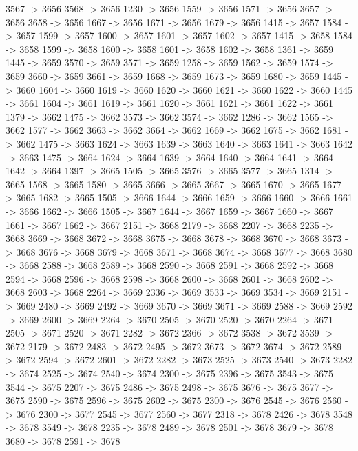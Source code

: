 {	3567 -> 3656
	3568 -> 3656
	1230 -> 3656
	1559 -> 3656
	1571 -> 3656
	3657 -> 3656
	3658 -> 3656
	1667 -> 3656
	1671 -> 3656
	1679 -> 3656
	1415 -> 3657
	1584 -> 3657
	1599 -> 3657
	1600 -> 3657
	1601 -> 3657
	1602 -> 3657
	1415 -> 3658
	1584 -> 3658
	1599 -> 3658
	1600 -> 3658
	1601 -> 3658
	1602 -> 3658
	1361 -> 3659
	1445 -> 3659
	3570 -> 3659
	3571 -> 3659
	1258 -> 3659
	1562 -> 3659
	1574 -> 3659
	3660 -> 3659
	3661 -> 3659
	1668 -> 3659
	1673 -> 3659
	1680 -> 3659
	1445 -> 3660
	1604 -> 3660
	1619 -> 3660
	1620 -> 3660
	1621 -> 3660
	1622 -> 3660
	1445 -> 3661
	1604 -> 3661
	1619 -> 3661
	1620 -> 3661
	1621 -> 3661
	1622 -> 3661
	1379 -> 3662
	1475 -> 3662
	3573 -> 3662
	3574 -> 3662
	1286 -> 3662
	1565 -> 3662
	1577 -> 3662
	3663 -> 3662
	3664 -> 3662
	1669 -> 3662
	1675 -> 3662
	1681 -> 3662
	1475 -> 3663
	1624 -> 3663
	1639 -> 3663
	1640 -> 3663
	1641 -> 3663
	1642 -> 3663
	1475 -> 3664
	1624 -> 3664
	1639 -> 3664
	1640 -> 3664
	1641 -> 3664
	1642 -> 3664
	1397 -> 3665
	1505 -> 3665
	3576 -> 3665
	3577 -> 3665
	1314 -> 3665
	1568 -> 3665
	1580 -> 3665
	3666 -> 3665
	3667 -> 3665
	1670 -> 3665
	1677 -> 3665
	1682 -> 3665
	1505 -> 3666
	1644 -> 3666
	1659 -> 3666
	1660 -> 3666
	1661 -> 3666
	1662 -> 3666
	1505 -> 3667
	1644 -> 3667
	1659 -> 3667
	1660 -> 3667
	1661 -> 3667
	1662 -> 3667
	2151 -> 3668
	2179 -> 3668
	2207 -> 3668
	2235 -> 3668
	3669 -> 3668
	3672 -> 3668
	3675 -> 3668
	3678 -> 3668
	3670 -> 3668
	3673 -> 3668
	3676 -> 3668
	3679 -> 3668
	3671 -> 3668
	3674 -> 3668
	3677 -> 3668
	3680 -> 3668
	2588 -> 3668
	2589 -> 3668
	2590 -> 3668
	2591 -> 3668
	2592 -> 3668
	2594 -> 3668
	2596 -> 3668
	2598 -> 3668
	2600 -> 3668
	2601 -> 3668
	2602 -> 3668
	2603 -> 3668
	2264 -> 3669
	2336 -> 3669
	3533 -> 3669
	3534 -> 3669
	2151 -> 3669
	2480 -> 3669
	2492 -> 3669
	3670 -> 3669
	3671 -> 3669
	2588 -> 3669
	2592 -> 3669
	2600 -> 3669
	2264 -> 3670
	2505 -> 3670
	2520 -> 3670
	2264 -> 3671
	2505 -> 3671
	2520 -> 3671
	2282 -> 3672
	2366 -> 3672
	3538 -> 3672
	3539 -> 3672
	2179 -> 3672
	2483 -> 3672
	2495 -> 3672
	3673 -> 3672
	3674 -> 3672
	2589 -> 3672
	2594 -> 3672
	2601 -> 3672
	2282 -> 3673
	2525 -> 3673
	2540 -> 3673
	2282 -> 3674
	2525 -> 3674
	2540 -> 3674
	2300 -> 3675
	2396 -> 3675
	3543 -> 3675
	3544 -> 3675
	2207 -> 3675
	2486 -> 3675
	2498 -> 3675
	3676 -> 3675
	3677 -> 3675
	2590 -> 3675
	2596 -> 3675
	2602 -> 3675
	2300 -> 3676
	2545 -> 3676
	2560 -> 3676
	2300 -> 3677
	2545 -> 3677
	2560 -> 3677
	2318 -> 3678
	2426 -> 3678
	3548 -> 3678
	3549 -> 3678
	2235 -> 3678
	2489 -> 3678
	2501 -> 3678
	3679 -> 3678
	3680 -> 3678
	2591 -> 3678
}
